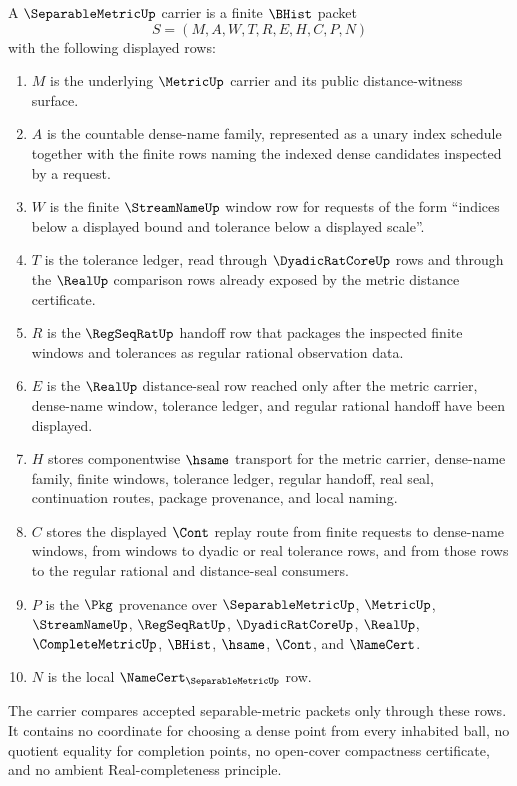 \begin{definition}
\label{def:separable-metric-carrier-surface}
A $\SeparableMetricUp$ carrier is a finite $\BHist$ packet
$$
S=(M,A,W,T,R,E,H,C,P,N)
$$
with the following displayed rows:
\begin{enumerate}
\item $M$ is the underlying $\MetricUp$ carrier and its public distance-witness surface.
\item $A$ is the countable dense-name family, represented as a unary index schedule together with the finite rows naming the indexed dense candidates inspected by a request.
\item $W$ is the finite $\StreamNameUp$ window row for requests of the form ``indices below a displayed bound and tolerance below a displayed scale''.
\item $T$ is the tolerance ledger, read through $\DyadicRatCoreUp$ rows and through the $\RealUp$ comparison rows already exposed by the metric distance certificate.
\item $R$ is the $\RegSeqRatUp$ handoff row that packages the inspected finite windows and tolerances as regular rational observation data.
\item $E$ is the $\RealUp$ distance-seal row reached only after the metric carrier, dense-name window, tolerance ledger, and regular rational handoff have been displayed.
\item $H$ stores componentwise $\hsame$ transport for the metric carrier, dense-name family, finite windows, tolerance ledger, regular handoff, real seal, continuation routes, package provenance, and local naming.
\item $C$ stores the displayed $\Cont$ replay route from finite requests to dense-name windows, from windows to dyadic or real tolerance rows, and from those rows to the regular rational and distance-seal consumers.
\item $P$ is the $\Pkg$ provenance over $\SeparableMetricUp$, $\MetricUp$, $\StreamNameUp$, $\RegSeqRatUp$, $\DyadicRatCoreUp$, $\RealUp$, $\CompleteMetricUp$, $\BHist$, $\hsame$, $\Cont$, and $\NameCert$.
\item $N$ is the local $\NameCert_{\SeparableMetricUp}$ row.
\end{enumerate}
The carrier compares accepted separable-metric packets only through these rows. It contains no coordinate for choosing a dense point from every inhabited ball, no quotient equality for completion points, no open-cover compactness certificate, and no ambient Real-completeness principle.
\end{definition}

